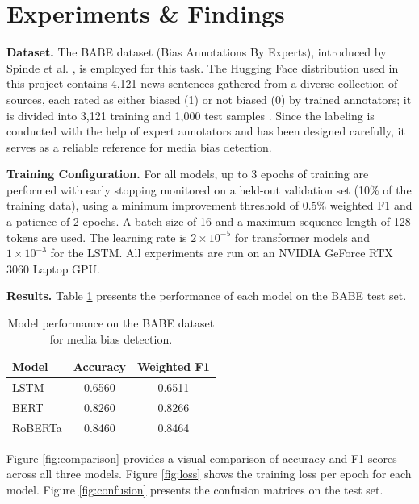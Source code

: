 \documentclass[a4paper,12pt]{report}
\begin{document}
\newpage

\section{Experiments \& Findings}
\textbf{Dataset.} The BABE dataset (Bias Annotations By Experts), introduced by Spinde et al. \cite{spinde2021}, is employed for this task. The Hugging Face distribution used in this project contains 4,121 news sentences gathered from a diverse collection of sources, each rated as either biased (1) or not biased (0) by trained annotators; it is divided into 3,121 training and 1,000 test samples \cite{huggingfaceBABE}. Since the labeling is conducted with the help of expert annotators and has been designed carefully, it serves as a reliable reference for media bias detection.

\textbf{Training Configuration.} For all models, up to 3 epochs of training are performed with early stopping monitored on a held-out validation set (10\% of the training data), using a minimum improvement threshold of 0.5\% weighted F1 and a patience of 2 epochs. A batch size of 16 and a maximum sequence length of 128 tokens are used. The learning rate is $2 \times 10^{-5}$ for transformer models and $1 \times 10^{-3}$ for the LSTM. All experiments are run on an NVIDIA GeForce RTX 3060 Laptop GPU.

\textbf{Results.} Table \ref{tab:atakan_results} presents the performance of each model on the BABE test set.
\begin{table}[h]
    \centering
    \begin{tabular}{lcc}
        \toprule
        \textbf{Model} & \textbf{Accuracy} & \textbf{Weighted F1} \\
        \midrule
        LSTM      & 0.6560 & 0.6511 \\
        BERT      & 0.8260 & 0.8266 \\
        RoBERTa   & 0.8460 & 0.8464 \\
        \bottomrule
    \end{tabular}
    \caption{Model performance on the BABE dataset for media bias detection.}
    \label{tab:atakan_results}
\end{table}

Figure \ref{fig:comparison} provides a visual comparison of accuracy and F1 scores across all three models. Figure \ref{fig:loss} shows the training loss per epoch for each model. Figure \ref{fig:confusion} presents the confusion matrices on the test set.
\end{document}
